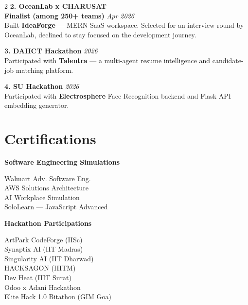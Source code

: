 \documentclass[letterpaper,10pt]{article}
\begin{document}
\begin{paracol}{2}
\vspace{5pt}
\textbf{2. OceanLab x CHARUSAT} \\
\small \textbf{Finalist (among 250+ teams)} \hfill \textit{Apr 2026} \\
\small Built \textbf{IdeaForge} — MERN SaaS workspace. Selected for an interview round by OceanLab, declined to stay focused on the development journey. \par

\vspace{5pt}
\textbf{3. DAIICT Hackathon} \hfill \textit{2026} \\
\small Participated with \textbf{Talentra} — a multi-agent resume intelligence and candidate-job matching platform. \par

\vspace{5pt}
\textbf{4. SU Hackathon} \hfill \textit{2026} \\
\small Participated with \textbf{Electrosphere} Face Recognition backend and Flask API embedding generator. \par

\vspace{6pt}

\section{Certifications}

\textbf{Software Engineering Simulations} \par
\vspace{2pt}
\small Walmart Adv. Software Eng. \\
\small AWS Solutions Architecture \\
\small AI Workplace Simulation \\
\small SoloLearn — JavaScript Advanced \par

\vspace{5pt}
\textbf{Hackathon Participations} \par
\vspace{2pt}
\small ArtPark CodeForge (IISc) \\
\small Synaptix AI (IIT Madras) \\
\small Singularity AI (IIT Dharwad) \\
\small HACKSAGON (IIITM) \\
\small Dev Heat (IIIT Surat) \\
\small Odoo x Adani Hackathon \\
\small Elite Hack 1.0 \quad Bitathon (GIM Goa) \par


\end{paracol}
\end{document}
